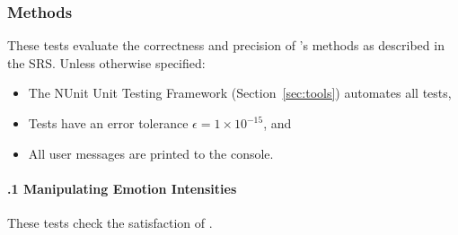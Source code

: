 \subsubsection{\progname{} Methods}\label{sec_sysMethods}
These tests evaluate the correctness and precision of \progname{}'s methods as
described in the SRS. Unless otherwise specified:
\begin{itemize}
    \item The NUnit Unit Testing Framework (Section~\ref{sec:tools}) automates
    all tests,
    \item Tests have an error tolerance $\epsilon = 1 \times 10^{-15}$, and
    \item All user messages are printed to the console.
\end{itemize}

\paragraph{\thesubsubsection.1 Manipulating Emotion
Intensities}\label{sec:sys-methods-emotionintensity}
These tests check the satisfaction of .

